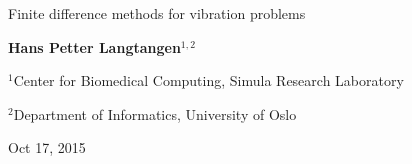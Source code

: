 \documentclass[%
oneside,                 %
final,                   %
10pt]{article}
\begin{document}







\thispagestyle{empty}

\begin{center}
{\LARGE\bf
\begin{spacing}{1.25}
Finite difference methods for vibration problems
\end{spacing}
}
\end{center}


\begin{center}
{\bf Hans Petter Langtangen${}^{1, 2}$} \\ [0mm]
\end{center}

\begin{center}
\centerline{{\small ${}^1$Center for Biomedical Computing, Simula Research Laboratory}}
\centerline{{\small ${}^2$Department of Informatics, University of Oslo}}
\end{center}
    

\begin{center}
Oct 17, 2015
\end{center}

\vspace{1cm}










\tableofcontents

\clearpage %
\end{document}
